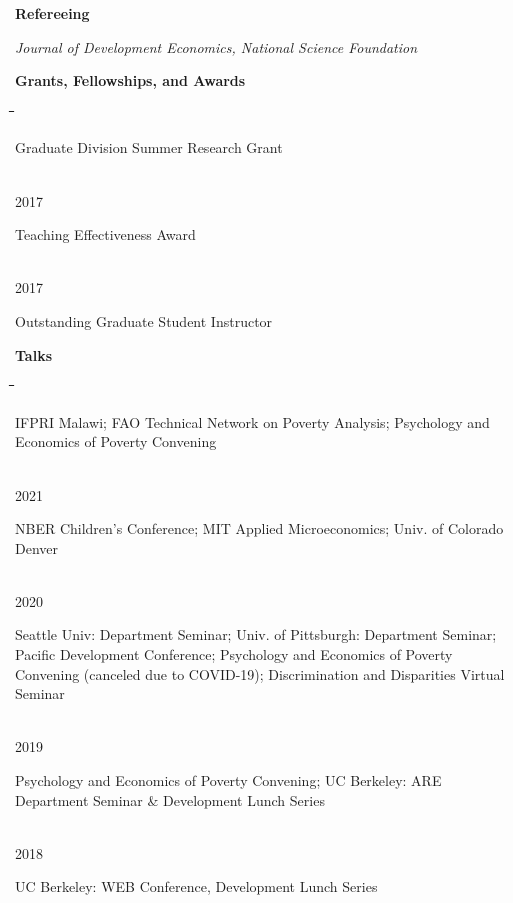 \documentclass[10pt, oneside]{article}
\makeatletter
\newlength\tdima
\newcommand\tabfill[1]{%
      \setlength\tdima{\linewidth}%
      \addtolength\tdima{\@totalleftmargin}%
      \addtolength\tdima{-\dimen\@curtab}%
      \parbox[t]{\tdima}{#1\ifhmode\strut\fi}}
\newcommand\mytabs{\hspace*{1cm}\=\hspace{1cm}\=\hspace{1cm}\=\hspace{1cm}\=\hspace{1cm}\=\hspace{1cm}\=\hspace{1cm}\=\hspace{1cm}\=\hspace{1cm}\=\hspace{1cm}}
\newenvironment{mysec}[1][\mytabs]
  {\begin{tabbing}#1\kill\ignorespaces}
  {\end{tabbing}}
\makeatother
\begin{document}
\begin{minipage}[t]{0.1\linewidth}
\textbf{Refereeing}
\end{minipage}\hspace{0.05\linewidth}
\begin{minipage}[t]{0.8\linewidth}
 \emph{Journal of Development Economics, National Science Foundation}
\end{minipage}\vspace{5mm}



\begin{minipage}[t]{0.1\linewidth}
\textbf{Grants, Fellowships, and Awards}
\end{minipage}\hspace{0.05\linewidth}
\begin{minipage}[t]{0.8\linewidth}
\begin{mysec} 
	2018 \>\>\tabfill{Graduate Division Summer Research Grant} \\
	2017 \>\>\tabfill{Teaching Effectiveness Award}\\
	2017 \>\>\tabfill{Outstanding Graduate Student Instructor}
\end{mysec} 
\end{minipage}\vspace{5mm}


\begin{minipage}[t]{0.1\linewidth}
\textbf{Talks}
\end{minipage}\hspace{0.05\linewidth}
\begin{minipage}[t]{0.8\linewidth}
\begin{mysec} 
	2022\>\> \tabfill{ IFPRI Malawi; FAO Technical Network on Poverty Analysis; Psychology and Economics of Poverty Convening} \\
	2021\>\> \tabfill{ NBER Children's Conference; MIT Applied Microeconomics; Univ. of Colorado Denver} \\
	2020\>\> \tabfill{Seattle Univ: Department Seminar; Univ. of Pittsburgh: Department Seminar; Pacific  Development Conference; Psychology and Economics of Poverty Convening (canceled due to COVID-19); Discrimination and Disparities Virtual Seminar } \\
	2019\>\> \tabfill{Psychology and Economics of Poverty Convening; UC Berkeley: ARE Department Seminar \& Development Lunch Series} \\
	2018\>\> \tabfill{UC Berkeley: WEB Conference,  Development Lunch Series} \\
\end{mysec} 
\end{minipage}\vspace{4mm}
\end{document}
